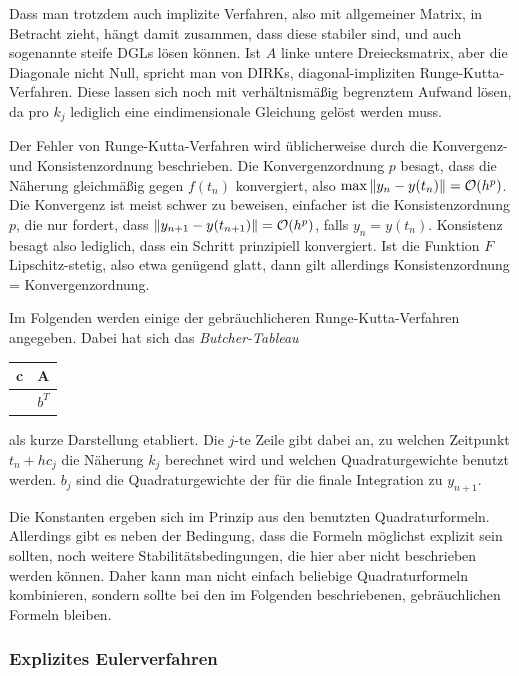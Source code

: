 Dass man trotzdem auch implizite Verfahren, also mit allgemeiner
Matrix, in Betracht zieht, hängt damit zusammen, dass diese stabiler
sind, und auch sogenannte steife DGLs lösen können. Ist $A$ linke
untere Dreiecksmatrix, aber die Diagonale nicht Null, spricht man von
DIRKs, diagonal-impliziten Runge-Kutta-Verfahren. Diese lassen sich
noch mit verhältnismäßig begrenztem Aufwand lösen, da pro $k_j$
lediglich eine eindimensionale Gleichung gelöst werden muss.

Der Fehler von Runge-Kutta-Verfahren wird üblicherweise durch die
Konvergenz- und Konsistenzordnung beschrieben. Die Konvergenzordnung
$p$ besagt, dass die Näherung gleichmäßig gegen $f(t_n)$ konvergiert, also
$\max \left\lVert{y_n - y(t_n)}\right\rVert = \mathcal O(h^p)$. Die Konvergenz ist
meist schwer zu beweisen, einfacher ist die Konsistenzordnung $p$, die
nur fordert, dass $\left\lVert{y_{n+1} - y(t_{n+1})}\right\rVert = \mathcal O(h^p)$, falls
$y_n=y(t_n)$. Konsistenz besagt also lediglich, dass ein Schritt
prinzipiell konvergiert. Ist die Funktion $F$ Lipschitz-stetig, also
etwa genügend glatt, dann gilt allerdings Konsistenzordnung =
Konvergenzordnung.

%
Im Folgenden werden einige der gebräuchlicheren Runge-Kutta-Verfahren
angegeben. Dabei hat sich das \emph{Butcher-Tableau}
\begin{center}
  \renewcommand{\arraystretch}{1.3}
  \begin{tabular}{r|l}
    c & A \\\hline
    & $b^T$
  \end{tabular}
\end{center}
als kurze Darstellung etabliert. Die $j$-te Zeile gibt dabei an, zu
welchen Zeitpunkt $t_n + hc_j$ die Näherung $k_j$ berechnet wird und
welchen Quadraturgewichte benutzt werden. $b_j$ sind die
Quadraturgewichte der für die finale Integration zu $y_{n+1}$.

Die Konstanten ergeben sich im Prinzip aus den benutzten
Quadraturformeln. Allerdings gibt es neben der Bedingung, dass die
Formeln möglichst explizit sein sollten, noch weitere
Stabilitätsbedingungen, die hier aber nicht beschrieben werden
können. Daher kann man nicht einfach beliebige Quadraturformeln
kombinieren, sondern sollte bei den im Folgenden beschriebenen,
gebräuchlichen Formeln bleiben.

\subsubsection{Explizites Eulerverfahren}

